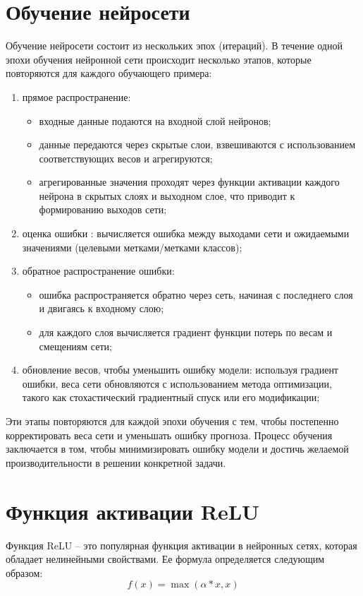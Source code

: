 \documentclass[12pt]{report}
\begin{document}
\section{Обучение нейросети}

Обучение нейросети состоит из нескольких эпох (итераций). В течение одной эпохи обучения нейронной сети происходит несколько этапов, которые повторяются для каждого обучающего примера:
\begin{enumerate}
    \item прямое распространение:
    \begin{itemize}
        \item входные данные подаются на входной слой нейронов;
        \item данные передаются через скрытые слои, взвешиваются с использованием соответствующих весов и агрегируются;
        \item агрегированные значения проходят через функции активации каждого нейрона в скрытых слоях и выходном слое, что приводит к формированию выходов сети;
    \end{itemize}
    \item  оценка ошибки : вычисляется ошибка между выходами сети и ожидаемыми значениями (целевыми метками/метками классов);
    \item обратное распространение ошибки:
    \begin{itemize}
        \item ошибка распространяется обратно через сеть, начиная с последнего слоя и двигаясь к входному слою;
        \item для каждого слоя вычисляется градиент функции потерь по весам и смещениям сети;
    \end{itemize}
    \item обновление весов, чтобы уменьшить ошибку модели: используя градиент ошибки, веса сети обновляются с использованием метода оптимизации, такого как стохастический градиентный спуск или его модификации;
\end{enumerate}

Эти этапы повторяются для каждой эпохи обучения с тем, чтобы постепенно корректировать веса сети и уменьшать ошибку прогноза. Процесс обучения заключается в том, чтобы минимизировать ошибку модели и достичь желаемой производительности в решении конкретной задачи.

\section{Функция активации ReLU}
Функция ReLU -- это популярная функция активации в нейронных сетях, которая обладает нелинейными свойствами. 
Ее формула определяется следующим образом:
\begin{equation}
    f(x) = \max(\alpha * x, x) 
\end{equation}
\end{document}

